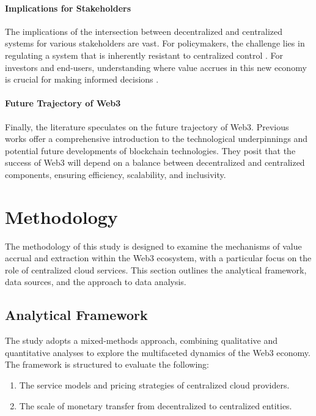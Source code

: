 \documentclass{article}
\begin{document}
\paragraph{Implications for Stakeholders} The implications of the intersection between decentralized and centralized systems for various stakeholders are vast. For policymakers, the challenge lies in regulating a system that is inherently resistant to centralized control \cite{defilippi2018blockchain}. For investors and end-users, understanding where value accrues in this new economy is crucial for making informed decisions \cite{buterin2014ethereum}.

\paragraph{Future Trajectory of Web3} Finally, the literature speculates on the future trajectory of Web3. Previous works\cite{narayananetal2016} offer a comprehensive introduction to the technological underpinnings and potential future developments of blockchain technologies. They posit that the success of Web3 will depend on a balance between decentralized and centralized components, ensuring efficiency, scalability, and inclusivity.

\section{Methodology}
The methodology of this study is designed to examine the mechanisms of value accrual and extraction within the Web3 ecosystem, with a particular focus on the role of centralized cloud services. This section outlines the analytical framework, data sources, and the approach to data analysis.

\subsection{Analytical Framework}
The study adopts a mixed-methods approach, combining qualitative and quantitative analyses to explore the multifaceted dynamics of the Web3 economy. The framework is structured to evaluate the following:

\begin{enumerate}
    \item The service models and pricing strategies of centralized cloud providers.
    \item The scale of monetary transfer from decentralized to centralized entities.
\end{enumerate}
\end{document}
